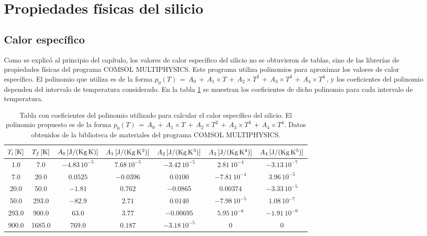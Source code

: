 \section{Propiedades físicas del silicio}
\subsection*{Calor específico}
Como se explicó al principio del capítulo, los valores de calor específico del silicio no se obtuvieron de tablas, sino de las librerías de propiedades físicas del programa COMSOL MULTIPHYSICS. Este programa utiliza polinomios para aproximar los valores de calor específico. El polinomio que utiliza es de la forma $p_0(T) \,=\, A_0\,+\,A_1 \times T\,+\,A_2 \times T^2\,+\,A_3 \times T^3\,+\,A_4 \times T^4\,$, y los coeficientes del polinomio dependen del intervalo de temperatura considerado. En la tabla \ref{tab:csi} se muestran los coeficientes de dicho polinomio para cada intervalo de temperatura.
\begin{table}[h!]
  \hspace{-1.6cm}
  \begin{tabular}{|c|c|c|c|c|c|c|}\hline
$T_{i}\,[\rm K]$	&	$T_{f}\,[\rm K]$	&	$A_0\,[\rm J/(\rm Kg\,K)]$	&	$A_1\,[\rm J/(\rm Kg\,K^2)]$	&	$A_2\,[\rm J/(\rm Kg\,K^3)]$	&	$A_3\,[\rm J/(\rm Kg\,K^4)]$	&	$A_4\,[\rm J/(\rm Kg\,K^5)]$	\\ \hline
1.0	&	7.0	&$	-4.83\,10^{-5}	$&$	7.68\,10^{-5}	$&$	-3.42\,10^{-5}	$&$	2.81\,10^{-4}	$&$	-3.13\,10^{-7}	$\\ \hline
7.0	&	20.0	&$	0.0525	$&$	-0.0396	$&$	0.0100	$&$	-7.81\,10^{-4}	$&$	3.96\,10^{-5}	$\\ \hline
20.0	&	50.0	&$	-1.81	$&$	0.762	$&$	-0.0865	$&$	0.00374	$&$	-3.33\,10^{-5}	$\\ \hline
50.0	&	293.0	&$	-82.9	$&$	2.71	$&$	0.0140	$&$	-7.98\,10^{-5}	$&$	1.08\,10^{-7}	$\\ \hline
293.0	&	900.0	&$	63.0	$&$	3.77	$&$	-0.00695	$&$	5.95\,10^{-6}	$&$	-1.91\,10^{-9}	$\\ \hline
900.0	&	1685.0	&$	769.0	$&$	0.187	$&$	-3.18\,10^{-5}	$&$	0	$&$	0	$\\ \hline
  \end{tabular}
  \caption[Tabla con coeficientes del polinomio utilizado para calcular el calor específico del silicio.]{Tabla con coeficientes del polinomio utilizado para calcular el calor específico del silicio. El polinomio propuesto es de la forma $p_0(T) \,=\, A_0\,+\,A_1 \times T\,+\,A_2 \times T^2\,+\,A_3 \times T^3\,+\,A_4 \times T^4$. Datos obtenidos de la biblioteca de materiales del programa COMSOL MULTIPHYSICS.}
  \label{tab:csi}
\end{table}
\newpage
